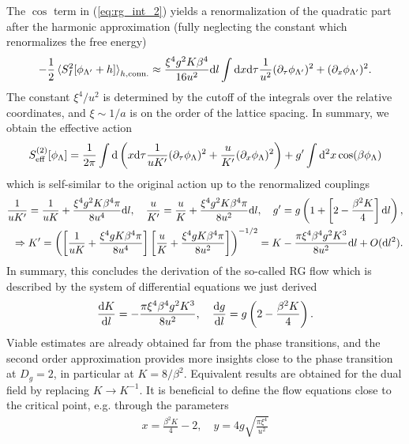 The $\cos$ term in (\cref{eq:rg_int_2}) yields a renormalization of the quadratic part after the harmonic approximation (fully neglecting the constant which renormalizes the free energy)
\begin{align}
    -\frac12\braket{S^2_I[\phi_{\Lambda'}+h]}_{h,{\rm conn.}}
    \approx
    \frac{\xi^4 g^2K\beta^4}{16u^2}\mathrm d l\int\mathrm d x\mathrm d\tau\frac1{u^2}(\partial_
    \tau\phi_{\Lambda'})^2+(\partial_x\phi_{\Lambda'})^2.
    \label{eq:RG_second_order_approximation}
\end{align}
The constant $\xi^4/u^2$ is determined by the cutoff of the integrals over the relative coordinates, and $\xi\sim1/a$ is on the order of the lattice spacing.
In summary, we obtain the effective action
\begin{align}
    S_{\rm eff}^{(2)}[\phi_\Lambda] = \frac1{2\pi}\int\mathrm d\left(  x\mathrm d\tau\frac{1}{uK'}(\partial_\tau\phi_\Lambda)^2 + \frac{u}{K'}(\partial_x\phi_\Lambda)^2 \right) +  g'\int\mathrm d^2 x\cos(\beta\phi_\Lambda)
\end{align}
which is self-similar to the original action up to the renormalized couplings
\begin{align}
    \frac1{uK'}=\frac1{uK}+\frac{\xi^4 g^2 K\beta^4\pi}{8 u^4}\mathrm d l,
    \quad
    \frac u{K'}=\frac u{K}+\frac{\xi^4 g^2 K\beta^4\pi}{8u^2}\mathrm d l,
    \quad
    g' = g\left( 1 + \left[ 2-\frac{\beta^2 K}4 \right]\mathrm d l \right),
    \\
    \Rightarrow
    K' = \left( \left[ \frac{1}{uK}+\frac{\xi^4 g K\beta^4\pi}{8u^4} \right]\left[ \frac{u}{K}+\frac{\xi^4 g K\beta^4\pi}{8u^2} \right] \right)^{-1/2}
    =
    K-\frac{\pi \xi^4 \beta^4 g^2 K^3}{8u^2}\mathrm d l + O(\mathrm d l^2).
\end{align}
In summary, this concludes the derivation of the so-called RG flow which is described by the system of differential equations we just derived
\begin{align}
    \frac{\mathrm d K}{\mathrm d l} = -\frac{\pi \xi^4 \beta^4 g^2 K^3}{8u^2},
    \quad
    \frac{\mathrm d g}{\mathrm d l} = g\left( 2-\frac{\beta^2K}4 \right).
\end{align}
Viable estimates are already obtained far from the phase transitions, and the second order approximation provides more insights close to the phase transition at $D_g=2$, in particular at $K=8/\beta^2$.
Equivalent results are obtained for the dual field by replacing $K\rightarrow K^{-1}$.
It is beneficial to define the flow equations close to the critical point, e.g. through the parameters
\begin{align}
    x = \frac{\beta^2 K}4 - 2,
    \quad
    y = 4g\sqrt{\frac{\pi\xi^4}{u^2}}
\end{align}
